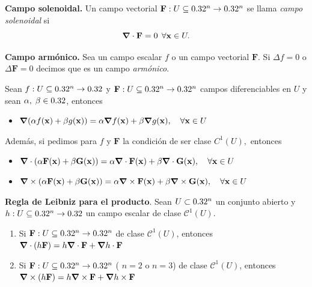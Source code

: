   
  \begin{definition}\textbf{Campo solenoidal.} Un campo vectorial $\mathbf{F}:U\subseteq0.32^n\to0.32^n$ se llama  \emph{campo solenoidal}  si $$\grad\cdot\mathbf{F}=0 \:\: \forall  \mathbf{x} \in U.$$ 
\end{definition}
\begin{definition}\textbf{Campo arm\'onico.}
    Sea un campo escalar $f$ o un campo vectorial $\mathbf{F}$. Si $\Delta f=0$ o $\Delta \mathbf{F}=0$  decimos que es un campo  \emph{arm\'onico}.
\end{definition}

\begin{propertie}
    Sean $f:U\subseteq0.32^n\to0.32$  y $\mathbf{F}:U\subseteq0.32^n\to0.32^n$  campos diferenciables en $U$ y sean $\alpha,\;\beta\in0.32$, entonces
    \begin{itemize}
        \item[1.] \(\grad(\alpha f(\mathbf{x})+\beta g(\mathbf{x}))=\alpha\grad f(\mathbf{x})+\beta\grad g(\mathbf{x}),\quad\forall\mathbf{x}\in U\) 
     \end{itemize}   
 
\:\:\:\:  Adem\'as, si pedimos para $f$ y $\mathbf{F}$  la condici\'on  de ser  clase $C^{1}(U),$ entonces
       \begin{itemize}
        \item[2.]  \(\grad\cdot(\alpha \mathbf{F}(\mathbf{x})+\beta \mathbf{G}(\mathbf{x}))=\alpha\grad\cdot\mathbf{F}(\mathbf{x})+\beta\grad\cdot\mathbf{G}(\mathbf{x}),\quad\forall\mathbf{x}\in U\)
        \item[3.] \(\grad\times(\alpha \mathbf{F}(\mathbf{x})+\beta \mathbf{G}(\mathbf{x}))=\alpha\grad\times\mathbf{F}(\mathbf{x})+\beta\grad\times\mathbf{G}(\mathbf{x}),\quad\forall\mathbf{x}\in U\)
    \end{itemize}
\end{propertie}
\begin{propertie}
    \textbf{Regla de Leibniz para el producto}.  Sean  $U\subset0.32^n$ un conjunto abierto  y  $h:U\subseteq0.32^n\to0.32$ un campo escalar de clase $\mathcal{C}^1(U)$.
    \begin{enumerate}
        \item Si $\mathbf{F}:U\subseteq0.32^n\to0.32^n$ de clase $\mathcal{C}^1(U)$, entonces $\grad\cdot(h\mathbf{F})=h\grad\cdot\mathbf{F}+\grad h\cdot\mathbf{F}$
        \item Si $\mathbf{F}:U\subseteq0.32^n\to0.32^n$ ( $n=2$ o $n=3$)  de clase $\mathcal{C}^1(U)$, entonces $\grad\times(h\mathbf{F})=h\grad\times\mathbf{F}+\grad h\times\mathbf{F}$
    \end{enumerate}
\end{propertie}
